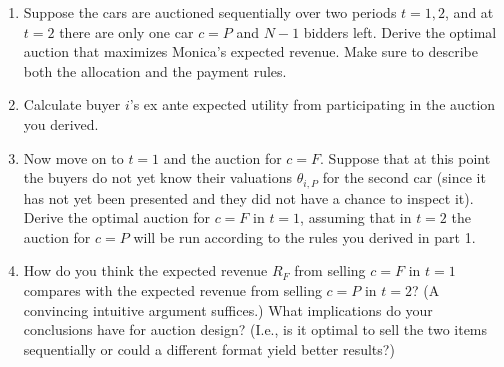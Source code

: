 \documentclass[a4paper]{article}
\newif\ifsolutions
\begin{document}
\begin{enumerate}
	\item Suppose the cars are auctioned sequentially over two periods $t=1,2$, and at $t=2$ there are only one car $c=P$ and $N-1$ bidders left. Derive the optimal auction that maximizes Monica's expected revenue. Make sure to describe both the allocation and the payment rules.
	
	\item Calculate buyer $i$'s ex ante expected utility from participating in the auction you derived.
	
	\item Now move on to $t=1$ and the auction for $c=F$. Suppose that at this point the buyers do not yet know their valuations $\theta_{i,P}$ for the second car (since it has not yet been presented and they did not have a chance to inspect it). Derive the optimal auction for $c=F$ in $t=1$, assuming that in $t=2$ the auction for $c=P$ will be run according to the rules you derived in part 1.
	
	\item How do you think the expected revenue $R_F$ from selling $c=F$ in $t=1$ compares with the expected revenue from selling $c=P$ in $t=2$? (A convincing intuitive argument suffices.) What implications do your conclusions have for auction design? (I.e., is it optimal to sell the two items sequentially or could a different format yield better results?)
\end{enumerate}



\ifsolutions
\end{document}
